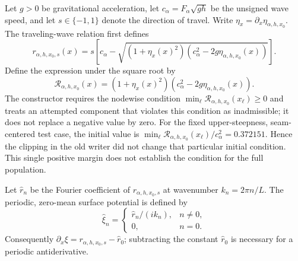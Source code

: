 Let $g>0$ be gravitational acceleration, let
$c_\alpha=F_\alpha\sqrt{gh}$ be the unsigned wave speed, and let
$s\in\{-1,1\}$ denote the direction of travel.  Write
$\eta_x=\partial_x\eta_{\alpha,h,x_0}$.  The traveling-wave relation first
defines
\begin{equation}
  r_{\alpha,h,x_0,s}(x)
  =
  s\left[
    c_\alpha-
    \sqrt{(1+\eta_x(x)^2)
      (c_\alpha^2-2g\eta_{\alpha,h,x_0}(x))}
  \right].
  \label{eq:paper-tanaka-potential-derivative}
\end{equation}
Define the expression under the square root by
\begin{equation}
  \mathcal R_{\alpha,h,x_0}(x)
  =
  (1+\eta_x(x)^2)
  (c_\alpha^2-2g\eta_{\alpha,h,x_0}(x)).
  \label{eq:paper-tanaka-radicand}
\end{equation}
The constructor requires the nodewise condition
$\min_\ell\mathcal R_{\alpha,h,x_0}(x_\ell)\geq0$ and treats an attempted component
that violates this condition as inadmissible; it does not replace a negative
value by zero.  For the fixed upper-steepness, seam-centered test case, the
initial value is
$\min_\ell\mathcal R_{\alpha,h,x_0}(x_\ell)/c_\alpha^2=0.372151$.  Hence the clipping
in the old writer did not change that particular initial condition.  This
single positive margin does not establish the condition for the full
population.

Let $\widehat r_n$ be the Fourier coefficient of
$r_{\alpha,h,x_0,s}$ at wavenumber $k_n=2\pi n/L$.  The periodic,
zero-mean surface potential is defined by
\begin{equation}
  \widehat\xi_n
  =
  \begin{cases}
    \widehat r_n/(ik_n),&n\ne0,\\
    0,&n=0.
  \end{cases}
  \label{eq:paper-tanaka-potential}
\end{equation}
Consequently $\partial_x\xi=r_{\alpha,h,x_0,s}-\widehat r_0$; subtracting
the constant $\widehat r_0$ is necessary for a periodic antiderivative.

